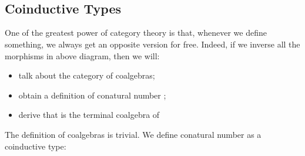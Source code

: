 \begin{code}
\AgdaSpace{}%
\AgdaSymbol{(}\AgdaFunction{[z,s]}\AgdaSpace{}%
\AgdaSymbol{)}\AgdaSpace{}%
\AgdaSpace{}%
\AgdaSpace{}%
\AgdaSymbol{(}\AgdaSpace{}%
\AgdaSymbol{(}\AgdaSpace{}%
\AgdaSymbol{)}\AgdaSpace{}%
\AgdaSymbol{)}\<%
\\
\>[0]\AgdaSpace{}%
\AgdaSpace{}%
\AgdaSymbol{(}\AgdaSpace{}%
\AgdaSymbol{)}\AgdaSpace{}%
\AgdaSymbol{=}\AgdaSpace{}%
\<%
\\
\>[0]\AgdaSpace{}%
\AgdaSpace{}%
\AgdaSymbol{(}\AgdaSpace{}%
\AgdaSymbol{)}\AgdaSpace{}%
\AgdaSymbol{=}\AgdaSpace{}%
\<%
\end{code}

\subsection{Coinductive Types}

One of the greatest power of category theory is that, whenever we define something, we always get an opposite version for free. Indeed, if we inverse all the morphisms in above diagram, then we will:
\begin{itemize}
  \item{talk about the category of coalgebras;}
  \item{obtain a definition of conatural number ;}
  \item{derive that  is the terminal coalgebra of }
\end{itemize}

The definition of coalgebras is trivial. We define conatural number as a coinductive type:

\begin{code}%
\>[0]\AgdaSpace{}%
\AgdaSpace{}%
\AgdaSymbol{:}\AgdaSpace{}%
\AgdaSpace{}%
\<%
\\
\>[0][@{}l@{\AgdaIndent{0}}]%
\>[2]\<%
\\
%
\>[2]\<%
\\
\>[2][@{}l@{\AgdaIndent{0}}]%
\>[4]\AgdaSpace{}%
\AgdaSymbol{:}\AgdaSpace{}%
\AgdaSpace{}%
\AgdaSpace{}%
\<%
\\
\>[0]\AgdaSpace{}%
\<%
\end{code}

